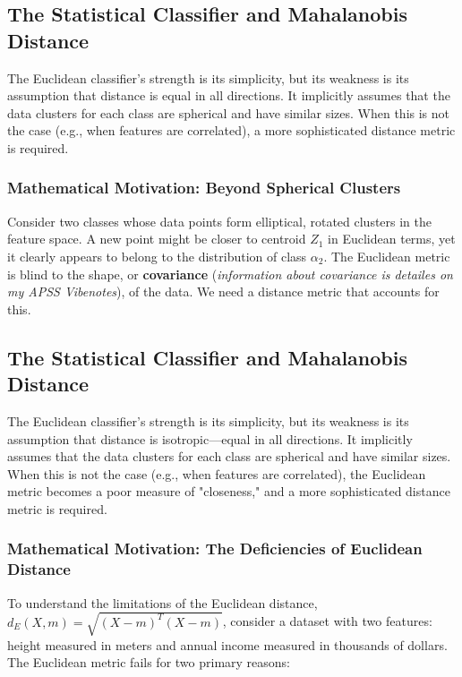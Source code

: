 \subsection*{The Statistical Classifier and Mahalanobis Distance}
The Euclidean classifier's strength is its simplicity, but its weakness is its assumption that distance is equal in all directions. It implicitly assumes that the data clusters for each class are spherical and have similar sizes. When this is not the case (e.g., when features are correlated), a more sophisticated distance metric is required.

\subsubsection*{Mathematical Motivation: Beyond Spherical Clusters}
Consider two classes whose data points form elliptical, rotated clusters in the feature space. A new point might be closer to centroid $Z_1$ in Euclidean terms, yet it clearly appears to belong to the distribution of class $\alpha_2$. The Euclidean metric is blind to the shape, or \textbf{covariance} (\textit{information about covariance is detailes on my APSS Vibenotes}), of the data. We need a distance metric that accounts for this.

\subsection*{The Statistical Classifier and Mahalanobis Distance}
The Euclidean classifier's strength is its simplicity, but its weakness is its assumption that distance is isotropic—equal in all directions. It implicitly assumes that the data clusters for each class are spherical and have similar sizes. When this is not the case (e.g., when features are correlated), the Euclidean metric becomes a poor measure of "closeness," and a more sophisticated distance metric is required.

\subsubsection*{Mathematical Motivation: The Deficiencies of Euclidean Distance}
To understand the limitations of the Euclidean distance, $d_E(X, m) = \sqrt{(X-m)^T(X-m)}$, consider a dataset with two features: height measured in meters and annual income measured in thousands of dollars. The Euclidean metric fails for two primary reasons:

